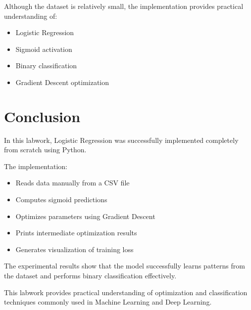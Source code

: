 \documentclass[12pt]{article}
\begin{document}
Although the dataset is relatively small, the implementation provides practical understanding of:
\begin{itemize}
    \item Logistic Regression
    \item Sigmoid activation
    \item Binary classification
    \item Gradient Descent optimization
\end{itemize}

\section{Conclusion}

In this labwork, Logistic Regression was successfully implemented completely from scratch using Python.

The implementation:
\begin{itemize}
    \item Reads data manually from a CSV file
    \item Computes sigmoid predictions
    \item Optimizes parameters using Gradient Descent
    \item Prints intermediate optimization results
    \item Generates visualization of training loss
\end{itemize}

The experimental results show that the model successfully learns patterns from the dataset and performs binary classification effectively.

This labwork provides practical understanding of optimization and classification techniques commonly used in Machine Learning and Deep Learning.
\end{document}
